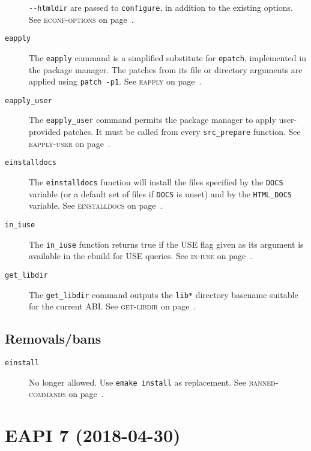 \documentclass[a4paper,nofoldmark]{leaflet}
\newcommand{\code}[1]{\texttt{#1}}
\newcommand{\featureref}[1]{\textsc{#1} on page~\pageref{feat:#1}}
\begin{document}
\begin{description}
    \code{-{}-htmldir} are passed to \code{configure}, in addition to
    the existing options.
    See \featureref{econf-options}.
    \item[\code{eapply}] The \code{eapply} command is a simplified
    substitute for \code{epatch}, implemented in the package manager.
    The patches from its file or directory arguments are applied using
    \code{patch -p1}.
    See \featureref{eapply}.
    \item[\code{eapply_user}] The \code{eapply_user} command permits
    the package manager to apply user-provided patches. It must be
    called from every \code{src_prepare} function.
    See \featureref{eapply-user}.
    \item[\code{einstalldocs}] The \code{einstalldocs} function will
    install the files specified by the \code{DOCS} variable (or a
    default set of files if \code{DOCS} is unset) and by the
    \code{HTML_DOCS} variable.
    See \featureref{einstalldocs}.
    \item[\code{in_iuse}] The \code{in_iuse} function returns
    true if the USE flag given as its argument is available in the
    ebuild for USE queries.
    See \featureref{in-iuse}.
    \item[\code{get_libdir}] The \code{get_libdir} command outputs
    the \code{lib*} directory basename suitable for the current ABI\@.
    See \featureref{get-libdir}.
\end{description}
\subsection{Removals/bans}
\label{sec:cs:eapi6-removalsbans}
\begin{description}
    \item[\code{einstall}] No longer allowed. Use \code{emake install}
    as replacement.
    See \featureref{banned-commands}.
\end{description}

\section{EAPI 7 (2018-04-30)}
\label{sec:cs:eapi7}
\end{document}
